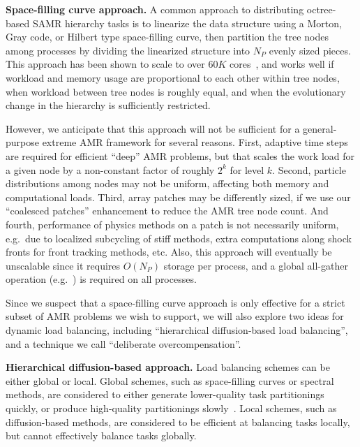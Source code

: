 \documentclass[10pt]{article}
\begin{document}
\textbf{Space-filling curve approach.}
A common approach to distributing octree-based SAMR hierarchy tasks is
to linearize the data structure using a Morton, Gray code, or Hilbert
type space-filling curve, then partition the tree nodes among
processes by dividing the linearized structure into $N_P$ evenly sized
pieces.  This approach has been shown to scale to over $60K$
cores~\cite{@@@ART}, and works well if workload and memory usage are
proportional to each other within tree nodes, when workload between
tree nodes is roughly equal, and when the evolutionary change in the
hierarchy is sufficiently restricted.

However, we anticipate that this approach will not be sufficient for a
general-purpose extreme AMR framework for several reasons.
%
First, adaptive time steps are required for efficient ``deep'' AMR
problems, but that scales the work load for a given node by a
non-constant factor of roughly $2^k$ for level $k$.
%
Second, particle distributions among nodes may not be uniform, affecting both memory and computational loads.
%
Third, array patches may be differently sized, if we use our
``coalesced patches'' enhancement to reduce the AMR tree node count.
%
And fourth, performance of physics methods on a patch is not
necessarily uniform, e.g.~due to localized subcycling of stiff
methods, extra computations along shock fronts for front tracking
methods, etc.  
%
Also, this approach will eventually be unscalable since it
requires $O(N_P)$ storage per process, and a global all-gather
operation (e.g.~) is required on all processes.

Since we suspect that a space-filling curve approach is only effective
for a strict subset of AMR problems we wish to support, we will also
explore two ideas for dynamic load balancing, including ``hierarchical
diffusion-based load balancing'', and a technique we call
``deliberate overcompensation''.

\textbf{Hierarchical diffusion-based approach.} Load balancing
schemes can be either global or local.  Global schemes, such as
space-filling curves or spectral methods, are considered to either
generate lower-quality task partitionings quickly, or produce
high-quality partitionings slowly~\cite{MeMo09}.  Local schemes,
such as diffusion-based methods, are considered to be efficient
at balancing tasks locally, but cannot effectively balance tasks
globally.
\end{document}
